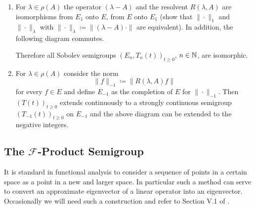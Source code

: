 \begin{remarks*}\label{rem:a1-19.1}
\begin{enumerate}[\upshape(i), wide, labelindent=.5em]
\item
For $\lambda \in \rho(A)$ the operator $(\lambda - A)$ and the resolvent $R(\lambda,A)$ are isomorphisms from $E_{1}$ onto $E$, \resp from $E$ onto $E_{1}$ (show that $\|\cdot\|_{1}$ and $\|\cdot\|_{\lambda}$ with $\|\cdot\|_{\lambda} \coloneqq \|(\lambda - A)\cdot\|$ are equivalent).
In addition, the following diagram commutes. 
\begin{center}
\end{center}
Therefore all Sobolev semigroups $(E_{n}, T_{n}(t))_{t \geq 0}$, $n \in \mathbb{N}$, are isomorphic.

\item
For $\lambda \in \rho(A)$ consider the norm
\[
    \|f\|_{-1} \coloneqq \|R(\lambda,A)f\|
\]
for every $f \in E$ and define $E_{-1}$ as the completion of $E$ for $\|\cdot\|_{-1}$.
Then $(T(t))_{t \geq 0}$ extends continuously to a strongly continuous semigroup $(T_{-1}(t))_{t \geq 0}$ on $E_{-1}$ and the above diagram can be extended to the negative integers.
\end{enumerate}
\end{remarks*}
\subsection{The \texorpdfstring{$\mathcal{F}$}{F}-Product Semigroup}\label{subsec:a1-3.7}%
It is standard in functional analysis to consider a sequence of points in a certain space as a point in a new and larger space.
In particular such a method can serve to convert an approximate eigenvector of a linear operator into an eigenvector.
Occasionally we will need such a construction and refer to Section V.1 of \citet{schaefer:1974}. 

